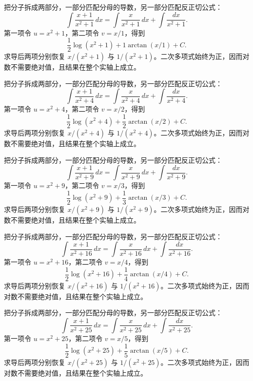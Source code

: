 \documentclass[UTF8,12pt,a4paper,fontset=fandol]{ctexart}
\begin{document}
\begin{solve}\label{ans:c13q19}
把分子拆成两部分，一部分匹配分母的导数，另一部分匹配反正切公式：
\[
\int\frac{x+1}{x^2+1}\,dx=\int\frac{x}{x^2+1}\,dx+\int\frac{dx}{x^2+1}.
\]
第一项令 $u=x^2+1$，第二项令 $v=x/1$，得到
\[
\frac12\log(x^2+1)+1\arctan(x/1)+C.
\]
求导后两项分别恢复 $x/(x^2+1)$ 与 $1/(x^2+1)$。二次多项式始终为正，因而对数不需要绝对值，且结果在整个实轴上成立。
\end{solve}

\begin{solve}\label{ans:c13q20}
把分子拆成两部分，一部分匹配分母的导数，另一部分匹配反正切公式：
\[
\int\frac{x+1}{x^2+4}\,dx=\int\frac{x}{x^2+4}\,dx+\int\frac{dx}{x^2+4}.
\]
第一项令 $u=x^2+4$，第二项令 $v=x/2$，得到
\[
\frac12\log(x^2+4)+\frac{1}{2}\arctan(x/2)+C.
\]
求导后两项分别恢复 $x/(x^2+4)$ 与 $1/(x^2+4)$。二次多项式始终为正，因而对数不需要绝对值，且结果在整个实轴上成立。
\end{solve}

\begin{solve}\label{ans:c13q21}
把分子拆成两部分，一部分匹配分母的导数，另一部分匹配反正切公式：
\[
\int\frac{x+1}{x^2+9}\,dx=\int\frac{x}{x^2+9}\,dx+\int\frac{dx}{x^2+9}.
\]
第一项令 $u=x^2+9$，第二项令 $v=x/3$，得到
\[
\frac12\log(x^2+9)+\frac{1}{3}\arctan(x/3)+C.
\]
求导后两项分别恢复 $x/(x^2+9)$ 与 $1/(x^2+9)$。二次多项式始终为正，因而对数不需要绝对值，且结果在整个实轴上成立。
\end{solve}

\begin{solve}\label{ans:c13q22}
把分子拆成两部分，一部分匹配分母的导数，另一部分匹配反正切公式：
\[
\int\frac{x+1}{x^2+16}\,dx=\int\frac{x}{x^2+16}\,dx+\int\frac{dx}{x^2+16}.
\]
第一项令 $u=x^2+16$，第二项令 $v=x/4$，得到
\[
\frac12\log(x^2+16)+\frac{1}{4}\arctan(x/4)+C.
\]
求导后两项分别恢复 $x/(x^2+16)$ 与 $1/(x^2+16)$。二次多项式始终为正，因而对数不需要绝对值，且结果在整个实轴上成立。
\end{solve}

\begin{solve}\label{ans:c13q23}
把分子拆成两部分，一部分匹配分母的导数，另一部分匹配反正切公式：
\[
\int\frac{x+1}{x^2+25}\,dx=\int\frac{x}{x^2+25}\,dx+\int\frac{dx}{x^2+25}.
\]
第一项令 $u=x^2+25$，第二项令 $v=x/5$，得到
\[
\frac12\log(x^2+25)+\frac{1}{5}\arctan(x/5)+C.
\]
求导后两项分别恢复 $x/(x^2+25)$ 与 $1/(x^2+25)$。二次多项式始终为正，因而对数不需要绝对值，且结果在整个实轴上成立。
\end{solve}
\end{document}

